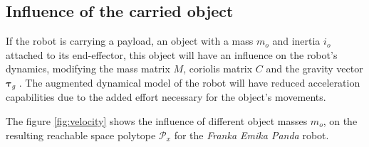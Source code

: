 \vspace{-0.3cm}
\subsection{Influence of the carried object}

If the robot is carrying a payload, an object with a mass $m_o$ and inertia $i_o$ attached to its end-effector, this object will have an influence on the robot's dynamics, modifying the mass matrix $M$, coriolis matrix $C$ and the gravity vector $\bm{\tau}_g$ \cite{hamad2019}.
The augmented dynamical model of the robot will have reduced acceleration capabilities due to the added effort necessary for the object's movements.

The figure \ref{fig:velocity} shows the influence of different object masses $m_o$, on the resulting reachable space polytope $\mathcal{P}_x$ for the \textit{Franka Emika Panda} robot. 






